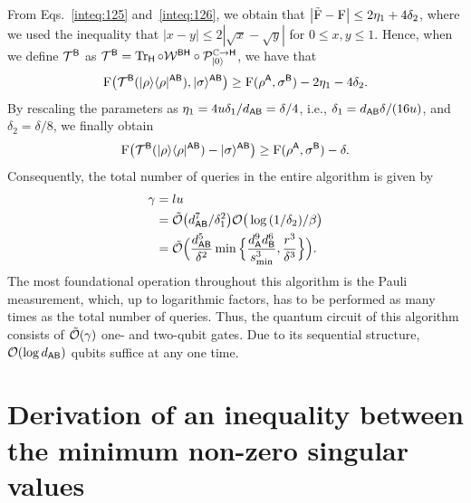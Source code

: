 From Eqs.~\eqref{inteq:125} and~\eqref{inteq:126}, we obtain that $\big|\tilde{{\mathrm{F}}} - {\mathrm{F}}\big| \leq 2\eta_1 + 4\delta_2$, where we used the inequality that $|x-y|\leq 2 |\sqrt{x} - \sqrt{y}|$ for $0 \leq x, y \leq 1$.
Hence, when we define ${\mathcal{T}}^{\mathsf{B}}$ as ${\mathcal{T}}^{\mathsf{B}} = \operatorname{Tr}_{\mathsf{H}} \circ {\mathcal{W}}^{{\mathsf{B}}{\mathsf{H}}} \circ {\mathcal{P}}_{|0\rangle}^{\mathbb{C}\rightarrow{\mathsf{H}}}$, we have that
\begin{align}
    {\mathrm{F}}\big({\mathcal{T}}^{\mathsf{B}}(|\rho\rangle\langle\rho|^{{\mathsf{A}}{\mathsf{B}}}), |\sigma\rangle^{{\mathsf{A}}{\mathsf{B}}}\big) \geq {\mathrm{F}}(\rho^{\mathsf{A}}, \sigma^{\mathsf{B}}) -2 \eta_1 - 4\delta_2.
\end{align}
By rescaling the parameters as $\eta_1 = 4u\delta_1/d_{{\mathsf{A}}{\mathsf{B}}} = \delta/4$, i.e., $\delta_1 = d_{{\mathsf{A}}{\mathsf{B}}}\delta/(16u)$, and $\delta_2 = \delta/8$, we finally obtain
\begin{align}
    {\mathrm{F}}\big({\mathcal{T}}^{\mathsf{B}}(|\rho\rangle\langle\rho|^{{\mathsf{A}}{\mathsf{B}}}) - |\sigma\rangle^{{\mathsf{A}}{\mathsf{B}}}\big) \geq {\mathrm{F}}(\rho^{\mathsf{A}}, \sigma^{\mathsf{B}}) - \delta.
\end{align}
Consequently, the total number of queries in the entire algorithm is given by
\begin{align}
    \gamma 
    &= lu \\
    &= \tilde{{\mathcal{O}}}\big(d_{{\mathsf{A}}{\mathsf{B}}}^7/\delta_1^2\big){\mathcal{O}}\big(\log{(1/\delta_2)}/\beta\big) \\
    &= \tilde{{\mathcal{O}}}\Big(\frac{d_{{\mathsf{A}}{\mathsf{B}}}^5}{\delta^2}\min\Big\{\frac{d_{\mathsf{A}}^9 d_{\mathsf{B}}^6}{s_{\rm min}^3}, \frac{r^3}{\delta^3}\Big\}\Big).
\end{align}
The most foundational operation throughout this algorithm is the Pauli measurement, which, up to logarithmic factors, has to be performed as many times as the total number of queries. 
Thus, the quantum circuit of this algorithm consists of $\tilde{{\mathcal{O}}}(\gamma)$ one- and two-qubit gates.
Due to its sequential structure, ${\mathcal{O}}(\log d_{{\mathsf{A}}{\mathsf{B}}})$ qubits suffice at any one time.













\section{Derivation of an inequality between the minimum non-zero singular values}
\label{sec:appendix product of singvalue}


